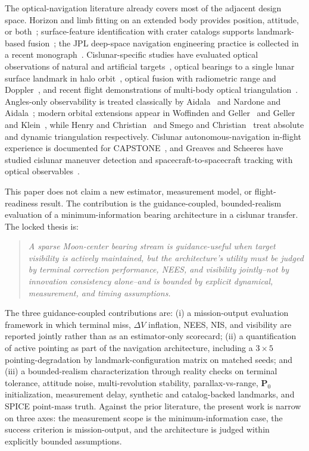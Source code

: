 \documentclass[10pt,twocolumn]{article}
\newcommand{\vect}[1]{\mathbf{#1}}
\begin{document}
The optical-navigation literature already covers most of the adjacent design space.  Horizon and limb fitting on an extended body provides position, attitude, or both~\cite{christian2021}; surface-feature identification with crater catalogs supports landmark-based fusion~\cite{christianCrater2021,robbins2019}; the JPL deep-space navigation engineering practice is collected in a recent monograph~\cite{owen2024}.  Cislunar-specific studies have evaluated optical observations of natural and artificial targets~\cite{bradley2020}, optical bearings to a single lunar surface landmark in halo orbit~\cite{hinga2023}, optical fusion with radiometric range and Doppler~\cite{ely2021}, and recent flight demonstrations of multi-body optical triangulation~\cite{krause2024}.  Angles-only observability is treated classically by Aidala~\cite{aidala1979} and Nardone and Aidala~\cite{nardone1981}; modern orbital extensions appear in Woffinden and Geller~\cite{woffinden2009} and Geller and Klein~\cite{gellerklein2014}, while Henry and Christian~\cite{henry2023} and Smego and Christian~\cite{smego2025} treat absolute and dynamic triangulation respectively.  Cislunar autonomous-navigation in-flight experience is documented for CAPSTONE~\cite{thompson2022}, and Greaves and Scheeres have studied cislunar maneuver detection and spacecraft-to-spacecraft tracking with optical observables~\cite{greaves2021,greaves2023}.

This paper does not claim a new estimator, measurement model, or flight-readiness result.  The contribution is the guidance-coupled, bounded-realism evaluation of a minimum-information bearing architecture in a cislunar transfer.  The locked thesis is:
\begin{quote}
\emph{A sparse Moon-center bearing stream is guidance-useful when target visibility is actively maintained, but the architecture's utility must be judged by terminal correction performance, NEES, and visibility jointly--not by innovation consistency alone--and is bounded by explicit dynamical, measurement, and timing assumptions.}
\end{quote}
The three guidance-coupled contributions are: (i) a mission-output evaluation framework in which terminal miss, $\Delta V$ inflation, NEES, NIS, and visibility are reported jointly rather than as an estimator-only scorecard; (ii) a quantification of active pointing as part of the navigation architecture, including a $3\times 5$ pointing-degradation by landmark-configuration matrix on matched seeds; and (iii) a bounded-realism characterization through reality checks on terminal tolerance, attitude noise, multi-revolution stability, parallax-vs-range, $\vect{P}_0$ initialization, measurement delay, synthetic and catalog-backed landmarks, and SPICE point-mass truth.  Against the prior literature, the present work is narrow on three axes: the measurement scope is the minimum-information case, the success criterion is mission-output, and the architecture is judged within explicitly bounded assumptions.
\end{document}
